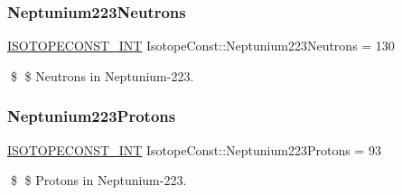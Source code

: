 \subsubsection{\texorpdfstring{Neptunium223\+Neutrons}{Neptunium223Neutrons}}
{\footnotesize\ttfamily \mbox{\hyperlink{group___isotope_const-_macros_ga5f18360b3e99483a35c32d789e62621c}{I\+S\+O\+T\+O\+P\+E\+C\+O\+N\+S\+T\+\_\+\+I\+NT}} Isotope\+Const\+::\+Neptunium223\+Neutrons = 130}

\$ \$ Neutrons in Neptunium-\/223. \mbox{\label{group___isotope_const-_neptunium-_np223_gaceb7c3a308d18ad4e040f34247e074f5}} 
\subsubsection{\texorpdfstring{Neptunium223\+Protons}{Neptunium223Protons}}
{\footnotesize\ttfamily \mbox{\hyperlink{group___isotope_const-_macros_ga5f18360b3e99483a35c32d789e62621c}{I\+S\+O\+T\+O\+P\+E\+C\+O\+N\+S\+T\+\_\+\+I\+NT}} Isotope\+Const\+::\+Neptunium223\+Protons = 93}

\$ \$ Protons in Neptunium-\/223. 